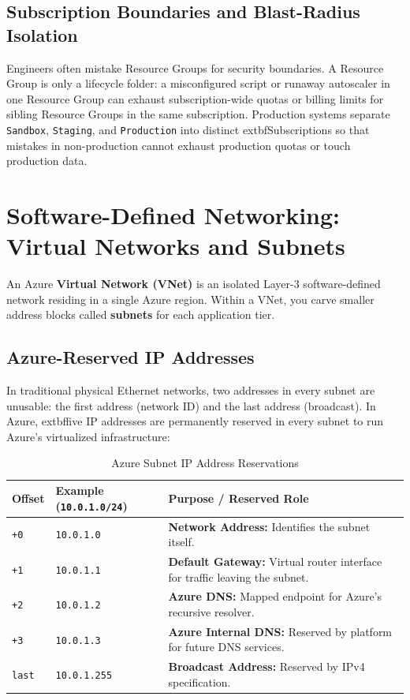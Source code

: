 \subsection{Subscription Boundaries and Blast-Radius Isolation}
Engineers often mistake Resource Groups for security boundaries. A Resource Group is only a lifecycle folder: a misconfigured script or runaway autoscaler in one Resource Group can exhaust subscription-wide quotas or billing limits for sibling Resource Groups in the same subscription. Production systems separate \texttt{Sandbox}, \texttt{Staging}, and \texttt{Production} into distinct 	extbf{Subscriptions} so that mistakes in non-production cannot exhaust production quotas or touch production data.

\section{Software-Defined Networking: Virtual Networks and Subnets}

An Azure \textbf{Virtual Network (VNet)} is an isolated Layer-3 software-defined network residing in a single Azure region. Within a VNet, you carve smaller address blocks called \textbf{subnets} for each application tier.

\subsection{Azure-Reserved IP Addresses}
In traditional physical Ethernet networks, two addresses in every subnet are unusable: the first address (network ID) and the last address (broadcast). In Azure, 	extbf{five IP addresses are permanently reserved} in every subnet to run Azure's virtualized infrastructure:

\begin{table}[htbp]
\centering\small
\begin{tabular}{lp{4.2cm}p{6.8cm}}
\toprule
\textbf{Offset} & \textbf{Example (\texttt{10.0.1.0/24})} & \textbf{Purpose / Reserved Role} \\
\midrule
\texttt{+0} & \texttt{10.0.1.0} & \textbf{Network Address:} Identifies the subnet itself. \\
\texttt{+1} & \texttt{10.0.1.1} & \textbf{Default Gateway:} Virtual router interface for traffic leaving the subnet. \\
\texttt{+2} & \texttt{10.0.1.2} & \textbf{Azure DNS:} Mapped endpoint for Azure's recursive resolver. \\
\texttt{+3} & \texttt{10.0.1.3} & \textbf{Azure Internal DNS:} Reserved by platform for future DNS services. \\
\texttt{last} & \texttt{10.0.1.255} & \textbf{Broadcast Address:} Reserved by IPv4 specification. \\
\bottomrule
\end{tabular}
\caption{Azure Subnet IP Address Reservations}
\label{tab:v3-ch01-reserved-ips}
\end{table}

